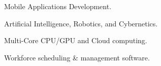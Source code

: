 

\begin{cventries}


  \cventry
    {} 
    {}
    {}
    {}
    {    	
	  \vspace{-1.7cm}
      \begin{multicols}{2}
      \begin{cvitems}
        \item {Mobile Applications Development.}
        \item {Artificial Intelligence, Robotics, and Cybernetics.}
        \item {Multi-Core CPU/GPU and Cloud computing.}
        \item {Workforce scheduling \& management software.}
      \end{cvitems}
	  \end{multicols}
	  \vspace{-0.5cm}
    }

\end{cventries}
